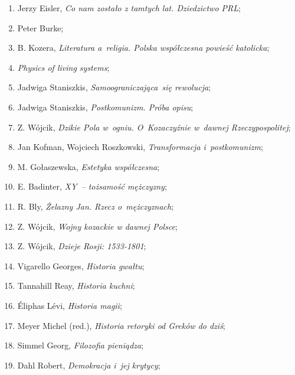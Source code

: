 \documentclass[a4paper,11pt]{article}
\begin{document}
\begin{enumerate}
\item Jerzy Eisler, \textit{Co nam zostało z tamtych lat. Dziedzictwo
    PRL};

\item Peter Burke;

\item B. Kozera, \textit{Literatura a~religia. Polska współczesna
    powieść katolicka};

\item \textit{Physics of living systems};

\item Jadwiga Staniszkis, \textit{Samoograniczająca~się rewolucja};

\item Jadwiga Staniszkis, \textit{Postkomunizm. Próba opisu};

\item Z. Wójcik, \textit{Dzikie Pola w~ogniu. O~Kozaczyźnie w~dawnej
    Rzeczypospolitej};

\item Jan Kofman, Wojciech Roszkowski, \textit{Transformacja
    i~postkomunizm};

\item M. Gołaszewska, \textit{Estetyka współczesna};

\item E. Badinter, \textit{XY~-- tożsamość mężczyzny};

\item R. Bly, \textit{Żelazny Jan. Rzecz o~mężczyznach};

\item Z. Wójcik, \textit{Wojny kozackie w dawnej Polsce};

\item Z. Wójcik, \textit{Dzieje Rosji: 1533-1801};

\item Vigarello Georges, \textit{Historia gwałtu};

\item Tannahill Reay, \textit{Historia kuchni};

\item Éliphas Lévi, \textit{Historia magii};

\item Meyer Michel (red.), \textit{Historia retoryki od Greków do dziś};

\item Simmel Georg, \textit{Filozofia pieniądza};

\item Dahl Robert, \textit{Demokracja i~jej krytycy};


\end{enumerate}
\end{document}
